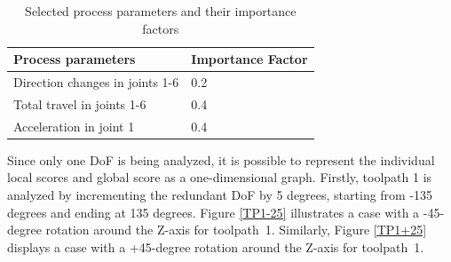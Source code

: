 \begin{table}[H]
	\centering
	\begin{tabular}{||l|l||}
		Process parameters& Importance Factor \\
		\hline
		\hline
		\hline
		Direction changes in joints 1-6	&		0.2 \\
		Total travel in joints 1-6	&  	0.4 \\
		Acceleration in joint 1	& 		0.4\\
		
		\hline
		\hline
	\end{tabular}
	
	\caption{Selected process parameters and their importance factors}
	\label{PPbasic}
\end{table}


Since only one \acrshort{DoF} is being analyzed, it is possible to represent the individual local scores and global score as a one-dimensional graph. Firstly, toolpath 1 is analyzed by incrementing the redundant \acrshort{DoF} by 5 degrees, starting from -135 degrees and ending at 135 degrees.
\newpage
Figure \ref{TP1-25} illustrates a case with a -45-degree rotation around the Z-axis for toolpath~1.
Similarly, Figure \ref{TP1+25} displays a case with a +45-degree rotation around the Z-axis for toolpath~1.

